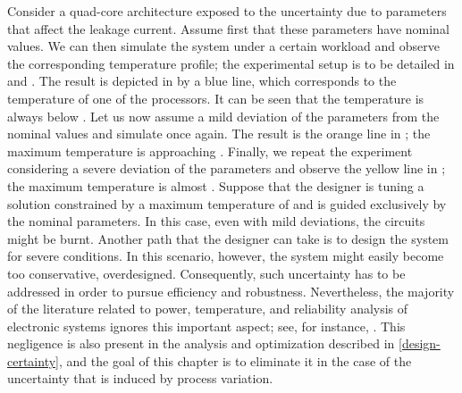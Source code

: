 Consider a quad-core architecture exposed to the uncertainty due to parameters
that affect the leakage current. Assume first that these parameters have nominal
values. We can then simulate the system under a certain workload and observe the
corresponding temperature profile; the experimental setup is to be detailed in
 and . The result is depicted in
 by a blue line, which corresponds to the temperature of one
of the processors. It can be seen that the temperature is always below
. Let us now assume a mild deviation of the parameters from the
nominal values and simulate once again. The result is the orange line in
; the maximum temperature is approaching .
Finally, we repeat the experiment considering a severe deviation of the
parameters and observe the yellow line in ; the maximum
temperature is almost . Suppose that the designer is tuning a
solution constrained by a maximum temperature of  and is guided
exclusively by the nominal parameters. In this case, even with mild deviations,
the circuits might be burnt. Another path that the designer can take is to
design the system for severe conditions. In this scenario, however, the system
might easily become too conservative, overdesigned. Consequently, such
uncertainty has to be addressed in order to pursue efficiency and robustness.
Nevertheless, the majority of the literature related to power, temperature, and
reliability analysis of electronic systems ignores this important aspect; see,
for instance, \cite{rao2009, rai2011, thiele2011}. This negligence is also
present in the analysis and optimization described in \cref{design-certainty},
and the goal of this chapter is to eliminate it in the case of the uncertainty
that is induced by process variation.
